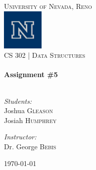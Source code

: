 \begin{titlepage}
	\begin{center}

		\textsc{\LARGE University of Nevada, Reno}\\[.5cm]
		\includegraphics[width=0.15\textwidth]{./logo.png}\\[.5cm]

		\textsc{\large CS 302 | Data Structures } \\[.5cm]

		\HRule \\[0.4cm]
		{ \huge \bfseries Assignment \#5}\\[0.4cm]

		\HRule \\[1.5cm]

		\begin{minipage}{0.4\textwidth}
			\begin{flushleft} \large
				\emph{Students:}\\
				Joshua \textsc{Gleason}\\
				Josiah \textsc{Humphrey}
			\end{flushleft}
		\end{minipage}
		\begin{minipage}{0.4\textwidth}
			\begin{flushright} \large
				\emph{Instructor:} \\
				Dr. George \textsc{Bebis}
			\end{flushright}
		\end{minipage}

		\vfill

		{\large \today}

	\end{center}

\end{titlepage}
